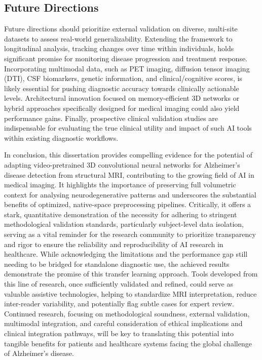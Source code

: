 \documentclass[11pt, a4paper]{article}
\begin{document}
\subsection{Future Directions}

Future directions should prioritize external validation on diverse, multi-site datasets to assess real-world generalizability. Extending the framework to longitudinal analysis, tracking changes over time within individuals, holds significant promise for monitoring disease progression and treatment response. Incorporating multimodal data, such as PET imaging, diffusion tensor imaging (DTI), CSF biomarkers, genetic information, and clinical/cognitive scores, is likely essential for pushing diagnostic accuracy towards clinically actionable levels. Architectural innovation focused on memory-efficient 3D networks or hybrid approaches specifically designed for medical imaging could also yield performance gains. Finally, prospective clinical validation studies are indispensable for evaluating the true clinical utility and impact of such AI tools within existing diagnostic workflows.

In conclusion, this dissertation provides compelling evidence for the potential of adapting video-pretrained 3D convolutional neural networks for Alzheimer's disease detection from structural MRI, contributing to the growing field of AI in medical imaging. It highlights the importance of preserving full volumetric context for analysing neurodegenerative patterns and underscores the substantial benefits of optimized, native-space preprocessing pipelines. Critically, it offers a stark, quantitative demonstration of the necessity for adhering to stringent methodological validation standards, particularly subject-level data isolation, serving as a vital reminder for the research community to prioritize transparency and rigor to ensure the reliability and reproducibility of AI research in healthcare. While acknowledging the limitations and the performance gap still needing to be bridged for standalone diagnostic use, the achieved results demonstrate the promise of this transfer learning approach. Tools developed from this line of research, once sufficiently validated and refined, could serve as valuable assistive technologies, helping to standardize MRI interpretation, reduce inter-reader variability, and potentially flag subtle cases for expert review. Continued research, focusing on methodological soundness, external validation, multimodal integration, and careful consideration of ethical implications and clinical integration pathways, will be key to translating this potential into tangible benefits for patients and healthcare systems facing the global challenge of Alzheimer's disease.
\end{document}
